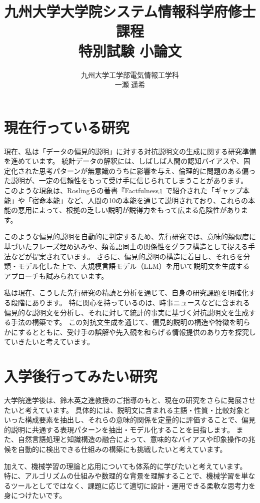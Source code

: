 \documentclass[dvipdfmx]{jarticle}
\date{}
\title{九州大学大学院システム情報科学府修士課程\\特別試験 小論文}
\author{九州大学工学部電気情報工学科\\一瀬 遥希}
\begin{document}
\maketitle

\section{現在行っている研究}
現在、私は「データの偏見的説明」に対する対抗説明文の生成に関する研究準備を進めています。
統計データの解釈には、しばしば人間の認知バイアスや、固定化された思考パターンが無意識のうちに影響を与え、倫理的に問題のある偏った説明が、一定の信頼性をもって受け手に信じられてしまうことがあります。
このような現象は、Roslingらの著書『Factfulness』で紹介された「ギャップ本能」や「宿命本能」など、人間の10の本能を通じて説明されており、これらの本能の悪用によって、根拠の乏しい説明が説得力をもって広まる危険性があります。

このような偏見的説明を自動的に判定するため、先行研究では、意味的類似度に基づいたフレーズ埋め込みや、類義語同士の関係性をグラフ構造として捉える手法などが提案されています。
さらに、偏見的説明の構造に着目し、それらを分類・モデル化した上で、大規模言語モデル（LLM）を用いて説明文を生成するアプローチも試みられています。

私は現在、こうした先行研究の精読と分析を通じて、自身の研究課題を明確化する段階にあります。
特に関心を持っているのは、時事ニュースなどに含まれる偏見的な説明文を分析し、それに対して統計的事実に基づく対抗説明文を生成する手法の構築です。
この対抗文生成を通じて、偏見的説明の構造や特徴を明らかにするとともに、受け手の誤解や先入観を和らげる情報提供のあり方を探究していきたいと考えています。

\section{入学後行ってみたい研究}
大学院進学後は、鈴木英之進教授のご指導のもと、現在の研究をさらに発展させたいと考えています。
具体的には、説明文に含まれる主語・性質・比較対象といった構成要素を抽出し、それらの意味的関係を定量的に評価することで、偏見的説明に共通する表現パターンを抽出・モデル化することを目指します。
また、自然言語処理と知識構造の融合によって、意味的なバイアスや印象操作の兆候を自動的に検出できる仕組みの構築にも挑戦したいと考えています。

加えて、機械学習の理論と応用についても体系的に学びたいと考えています。
特に、アルゴリズムの仕組みや数理的な背景を理解することで、機械学習を単なるツールとしてではなく、課題に応じて適切に設計・運用できる柔軟な思考力を身につけたいです。
\end{document}
